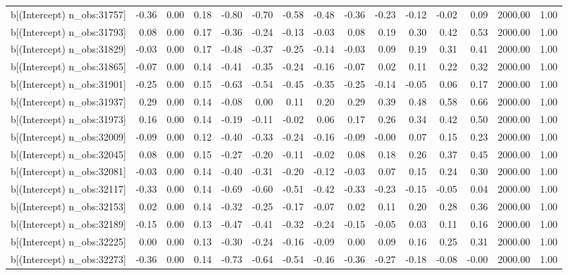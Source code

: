\begin{table}[ht]
\begin{tabular}{rrrrrrrrrrrrrrr}
  b[(Intercept) n\_obs:31757] & -0.36 & 0.00 & 0.18 & -0.80 & -0.70 & -0.58 & -0.48 & -0.36 & -0.23 & -0.12 & -0.02 & 0.09 & 2000.00 & 1.00 \\ 
  b[(Intercept) n\_obs:31793] & 0.08 & 0.00 & 0.17 & -0.36 & -0.24 & -0.13 & -0.03 & 0.08 & 0.19 & 0.30 & 0.42 & 0.53 & 2000.00 & 1.00 \\ 
  b[(Intercept) n\_obs:31829] & -0.03 & 0.00 & 0.17 & -0.48 & -0.37 & -0.25 & -0.14 & -0.03 & 0.09 & 0.19 & 0.31 & 0.41 & 2000.00 & 1.00 \\ 
  b[(Intercept) n\_obs:31865] & -0.07 & 0.00 & 0.14 & -0.41 & -0.35 & -0.24 & -0.16 & -0.07 & 0.02 & 0.11 & 0.22 & 0.32 & 2000.00 & 1.00 \\ 
  b[(Intercept) n\_obs:31901] & -0.25 & 0.00 & 0.15 & -0.63 & -0.54 & -0.45 & -0.35 & -0.25 & -0.14 & -0.05 & 0.06 & 0.17 & 2000.00 & 1.00 \\ 
  b[(Intercept) n\_obs:31937] & 0.29 & 0.00 & 0.14 & -0.08 & 0.00 & 0.11 & 0.20 & 0.29 & 0.39 & 0.48 & 0.58 & 0.66 & 2000.00 & 1.00 \\ 
  b[(Intercept) n\_obs:31973] & 0.16 & 0.00 & 0.14 & -0.19 & -0.11 & -0.02 & 0.06 & 0.17 & 0.26 & 0.34 & 0.42 & 0.50 & 2000.00 & 1.00 \\ 
  b[(Intercept) n\_obs:32009] & -0.09 & 0.00 & 0.12 & -0.40 & -0.33 & -0.24 & -0.16 & -0.09 & -0.00 & 0.07 & 0.15 & 0.23 & 2000.00 & 1.00 \\ 
  b[(Intercept) n\_obs:32045] & 0.08 & 0.00 & 0.15 & -0.27 & -0.20 & -0.11 & -0.02 & 0.08 & 0.18 & 0.26 & 0.37 & 0.45 & 2000.00 & 1.00 \\ 
  b[(Intercept) n\_obs:32081] & -0.03 & 0.00 & 0.14 & -0.40 & -0.31 & -0.20 & -0.12 & -0.03 & 0.07 & 0.15 & 0.24 & 0.30 & 2000.00 & 1.00 \\ 
  b[(Intercept) n\_obs:32117] & -0.33 & 0.00 & 0.14 & -0.69 & -0.60 & -0.51 & -0.42 & -0.33 & -0.23 & -0.15 & -0.05 & 0.04 & 2000.00 & 1.00 \\ 
  b[(Intercept) n\_obs:32153] & 0.02 & 0.00 & 0.14 & -0.32 & -0.25 & -0.17 & -0.07 & 0.02 & 0.11 & 0.20 & 0.28 & 0.36 & 2000.00 & 1.00 \\ 
  b[(Intercept) n\_obs:32189] & -0.15 & 0.00 & 0.13 & -0.47 & -0.41 & -0.32 & -0.24 & -0.15 & -0.05 & 0.03 & 0.11 & 0.16 & 2000.00 & 1.00 \\ 
  b[(Intercept) n\_obs:32225] & 0.00 & 0.00 & 0.13 & -0.30 & -0.24 & -0.16 & -0.09 & 0.00 & 0.09 & 0.16 & 0.25 & 0.31 & 2000.00 & 1.00 \\ 
  b[(Intercept) n\_obs:32273] & -0.36 & 0.00 & 0.14 & -0.73 & -0.64 & -0.54 & -0.46 & -0.36 & -0.27 & -0.18 & -0.08 & -0.00 & 2000.00 & 1.00 \\ 

\end{tabular}
\end{table}
